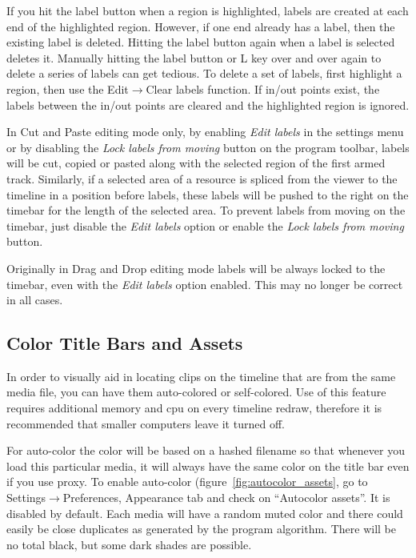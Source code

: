 If you hit the label button when a region is highlighted, labels are created at each end of the highlighted region. 
However, if one end already has a label, then the existing label is deleted. 
Hitting the label button again when a label is selected deletes it. 
Manually hitting the label button or L key over and over again to delete a series of labels can get tedious. 
To delete a set of labels, first highlight a region, then use the Edit$\rightarrow$Clear labels function. 
If in/out points exist, the labels between the in/out points are cleared and the highlighted region is ignored.


In Cut and Paste editing mode only, by enabling \emph{Edit labels} in the settings menu or by disabling the \emph{Lock labels from moving} button on the program toolbar, labels will be cut, copied or pasted along with the selected region of the first armed track. 
Similarly, if a selected area of a resource is spliced from the viewer to the timeline in a position before labels, these labels will be pushed to the right on the timebar for the length of the selected area. 
To prevent labels from moving on the timebar, just disable the \emph{Edit labels} option or enable the \emph{Lock labels from moving} button.


Originally in Drag and Drop editing mode labels will be always locked to the timebar, even with the \emph{Edit labels} option enabled.  
This may no longer be correct in all cases. 

\subsection{Color Title Bars and Assets}%
\label{sub:color_title_bars_and_assets}

In order to visually aid in locating clips on the timeline that are from the same media file, you can have them auto-colored or self-colored.  
Use of this feature requires additional memory and cpu on every timeline redraw, therefore it is recommended that smaller computers leave it turned off.

For auto-color the color will be based on a hashed filename so that whenever you load this particular media, it will always have the same color on the title bar even if you use proxy.  
To enable auto-color (figure~\ref{fig:autocolor_assets}, go to Settings$\rightarrow$Preferences, Appearance tab and check on “Autocolor assets”.  
It is disabled by default.  
Each media will have a random muted color and there could easily be close duplicates as generated by the program algorithm.  There will be no total black, but some dark shades are possible.  

